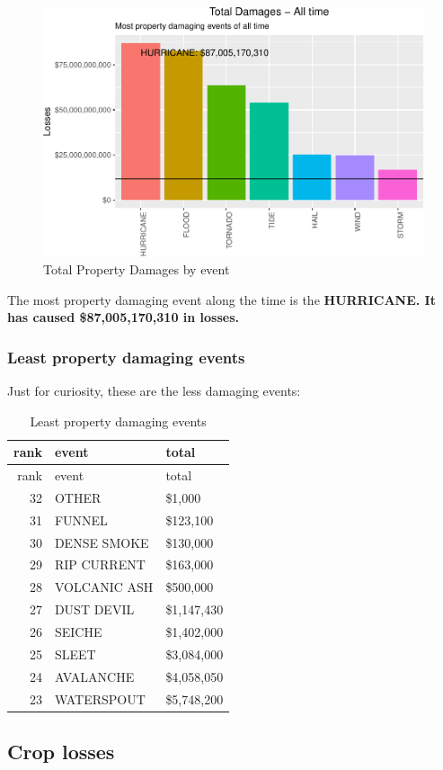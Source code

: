 \documentclass[]{article}
\begin{document}
\begin{figure}[htbp]
\centering
\includegraphics{readme_files/figure-latex/prop-all-plot-1.pdf}
\caption{Total Property Damages by event}
\end{figure}

The most property damaging event along the time is the
\textbf{HURRICANE. It has caused \$87,005,170,310 in losses.}

\subsubsection{Least property damaging
events}\label{least-property-damaging-events}

Just for curiosity, these are the less damaging events:

\begin{longtable}[]{@{}rll@{}}
\caption{Least property damaging events}\tabularnewline
\toprule
rank & event & total\tabularnewline
\midrule
\endfirsthead
\toprule
rank & event & total\tabularnewline
\midrule
\endhead
32 & OTHER & \$1,000\tabularnewline
31 & FUNNEL & \$123,100\tabularnewline
30 & DENSE SMOKE & \$130,000\tabularnewline
29 & RIP CURRENT & \$163,000\tabularnewline
28 & VOLCANIC ASH & \$500,000\tabularnewline
27 & DUST DEVIL & \$1,147,430\tabularnewline
26 & SEICHE & \$1,402,000\tabularnewline
25 & SLEET & \$3,084,000\tabularnewline
24 & AVALANCHE & \$4,058,050\tabularnewline
23 & WATERSPOUT & \$5,748,200\tabularnewline
\bottomrule
\end{longtable}

\subsection{Crop losses}\label{crop-losses}
\end{document}
